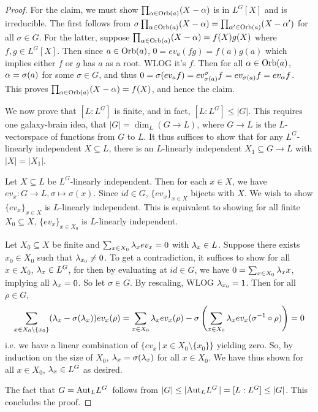 \documentclass[main.tex]{subfiles}
\begin{document}
\begin{proof}
  For the claim, we must show $\prod_{\al \in \Orb(a)} (X - \al)$
  is in $L^G[X]$ and is irreducible. 
  The first follows from 
  $\sigma \prod_{\al \in \Orb(a)} (X - \al) 
  = \prod_{\al^\prime \in \Orb(a)} (X - \al^\prime)$
  for all $\sigma \in G$. 
  For the latter, suppose $\prod_{\al \in \Orb(a)}(X - \al) = f(X)g(X)$
  where $f, g \in L^G[X]$. 
  Then since $a \in \Orb(a)$, $0 = ev_a(f g) = f(a) g(a)$
  which implies either $f$ or $g$ has $a$ as a root. 
  WLOG it's $f$. 
  Then for all $\al \in \Orb(a)$, 
  $\al = \sigma(a)$ for some $\sigma \in G$,
  and thus $0 = \sigma(ev_a f) = ev_{\sigma(a)}^\sigma f 
  = ev_{\sigma(a)} f = ev_\al f$.
  This proves $\prod_{\al \in \Orb(a)} (X - \al) = f(X)$,
  and hence the claim. 

  We now prove that $[L : L^G]$ is finite, and in fact, 
  $[L : L^G] \leq |G|$. 
  This requires one galaxy-brain idea,
  that $|G| = \dim_L (G \to L)$, 
  where $G \to L$ is the $L$-vectorspace of functions from $G$ to $L$. 
  It thus suffices to show that 
  for any $L^G$-linearly independent $X \subseteq L$, 
  there is an $L$-linearly independent $X_1 \subseteq G \to L$
  with $|X| = |X_1|$. 

  Let $X \subseteq L$ be $L^G$-linearly independent.
  Then for each $x \in X$, we have $ev_x : G \to L, \sigma \mapsto \sigma(x)$.
  Since $id \in G$, $\{ev_x\}_{x \in X}$ bijects with $X$. 
  We wish to show $\{ev_x\}_{x \in X}$ is $L$-linearly independent. 
  This is equivalent to showing for all finite $X_0 \subseteq X$,
  $\{ev_x\}_{x \in X_0}$ is $L$-linearly independent. 

  Let $X_0 \subseteq X$ be finite and $\sum_{x \in X_0} \la_x ev_x = 0$
  with $\la_x \in L$. 
  Suppose there exists $x_0 \in X_0$ such that $\la_{x_0} \neq 0$. 
  To get a contradiction, 
  it suffices to show for all $x \in X_0$, $\la_x \in L^G$,
  for then by evaluating at $id \in G$, 
  we have $0 = \sum_{x \in X_0} \la_x x$,
  implying all $\la_x = 0$. 
  So let $\sigma \in G$.
  By rescaling, WLOG $\la_{x_0} = 1$. 
  Then for all $\rho \in G$, 
  \[
    \sum_{x \in X_0 \setminus\{x_0\}} (\la_x - \sigma(\la_x)) ev_x (\rho)
    = \sum_{x \in X_0} \la_x ev_x (\rho)
      - \sigma \left( 
        \sum_{x \in X_0} \la_x ev_x(\sigma^{-1} \circ \rho) 
      \right)
    = 0 
  \]
  i.e. we have a linear combination of 
  $\{ev_x \,|\, x \in X_0 \setminus \{x_0\}\}$ yielding zero.
  So, by induction on the size of $X_0$, 
  $\la_x = \sigma(\la_x)$ for all $x \in X_0$.
  We have thus shown for all $x \in X_0$, $\la_x \in L^G$ as desired. 
  
  The fact that $G = \aut{L^G}{L}$ follows from 
  $|G| \leq |\aut{L^G}{L}| = [L : L^G] \leq |G|$.
  This concludes the proof. 
\end{proof}
\end{document}

